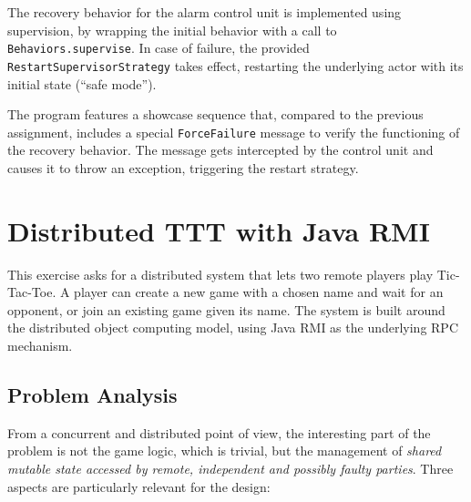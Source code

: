 \documentclass{scrartcl}
\begin{document}
The recovery behavior for the alarm control unit is implemented using supervision, by wrapping the initial behavior with a call to \texttt{Behaviors.supervise}. In case of failure, the provided \texttt{RestartSupervisorStrategy} takes effect, restarting the underlying actor with its initial state (``safe mode'').

The program features a showcase sequence that, compared to the previous assignment, includes a special \texttt{ForceFailure} message to verify the functioning of the recovery behavior. The message gets intercepted by the control unit and causes it to throw an exception, triggering the restart strategy.

\section{Distributed TTT with Java RMI}

This exercise asks for a distributed system that lets two remote players play Tic-Tac-Toe. A player can create a new game with a chosen name and wait for an opponent, or join an existing game given its name. The system is built around the distributed object computing model, using Java RMI as the underlying RPC mechanism.

\subsection{Problem Analysis}

From a concurrent and distributed point of view, the interesting part of the problem is not the game logic, which is trivial, but the management of \emph{shared mutable state accessed by remote, independent and possibly faulty parties}. Three aspects are particularly relevant for the design:
\end{document}
